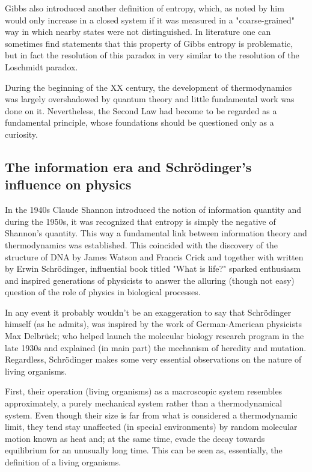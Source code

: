 \documentclass[a4paper,12pt]{article}
\begin{document}
Gibbs also introduced another definition of entropy, which, as noted by him \cite{Gibbs:1928tw} would only increase in a closed system if it was measured in a "coarse-grained" way in which nearby states were not distinguished. In literature one can sometimes find statements \cite{Evans:2241458} that this property of Gibbs entropy is problematic, but in fact the resolution of this paradox in very similar to the resolution of the Loschmidt paradox.

During the beginning of the XX century, the development of thermodynamics was largely overshadowed by quantum theory and little fundamental work was done on it. 
Nevertheless, the Second Law had become to be regarded as a fundamental principle, whose foundations should be questioned only as a curiosity\cite{Wolfram:552851}.

\subsection{The information era and Schrödinger's influence on physics}

In the 1940s Claude Shannon introduced the notion of information quantity \cite{Shannon:429164} and during the 1950s, it was recognized that entropy is simply the negative of Shannon's quantity. This way a fundamental link between information theory and thermodynamics was established. This coincided with the discovery of the structure of DNA by James Watson and Francis Crick and together with written by Erwin Schrödinger, influential book titled "What is life?" sparked enthusiasm and inspired generations of physicists to answer the alluring (though not easy) question of the role of physics in biological processes. 

In any event it probably wouldn't be an exaggeration to say that Schrödinger himself (as he admits), was inspired by the work of German-American physicists Max Delbrück; who helped launch the molecular biology research program in the late 1930s and explained (in main part) the mechanism of heredity and mutation.
Regardless, Schrödinger makes some very essential observations on the nature of living organisms.

First, their operation (living organisms) as a macroscopic system resembles approximately, a purely mechanical system rather than a thermodynamical system. 
Even though their size is far from what is considered a thermodynamic limit, they tend stay unaffected (in special environments) by random molecular motion known as heat and; at the same time, evade the decay towards equilibrium for an unusually long time. This can be seen as, essentially, the definition of a living organisms.
\end{document}
